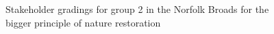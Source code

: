 \documentclass[
  12pt,
  letterpaper,
  DIV=11,
  numbers=noendperiod]{scrartcl}
\begin{document}
\begin{figure}[H]


\caption{\label{fig-BroadsBigG2}Stakeholder gradings for group 2 in the
Norfolk Broads for the bigger principle of nature restoration}

\end{figure}%
\end{document}
